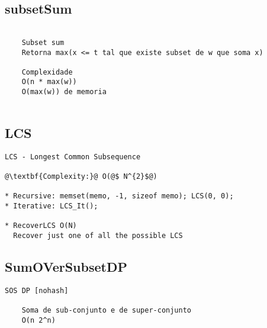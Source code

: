 \vspace{-2pt}
\subsection{subsetSum}
\vspace{-4pt}
\begin{lstlisting}[style=description]

    Subset sum
    Retorna max(x <= t tal que existe subset de w que soma x)

    Complexidade
    O(n * max(w))
    O(max(w)) de memoria


\end{lstlisting}
\vspace{-5pt}
\raggedbottom
\hrulefill

\vspace{-2pt}
\subsection{LCS}
\vspace{-4pt}
\begin{lstlisting}[style=description]
LCS - Longest Common Subsequence

@\textbf{Complexity:}@ O(@$ N^{2}$@)

* Recursive: memset(memo, -1, sizeof memo); LCS(0, 0);
* Iterative: LCS_It();

* RecoverLCS O(N)
  Recover just one of all the possible LCS

\end{lstlisting}
\vspace{-5pt}
\raggedbottom
\hrulefill

\vspace{-2pt}
\subsection{SumOVerSubsetDP}
\vspace{-4pt}
\begin{lstlisting}[style=description]
    SOS DP [nohash]
    
    Soma de sub-conjunto e de super-conjunto
    O(n 2^n)


\end{lstlisting}
\vspace{-5pt}
\raggedbottom
\hrulefill

